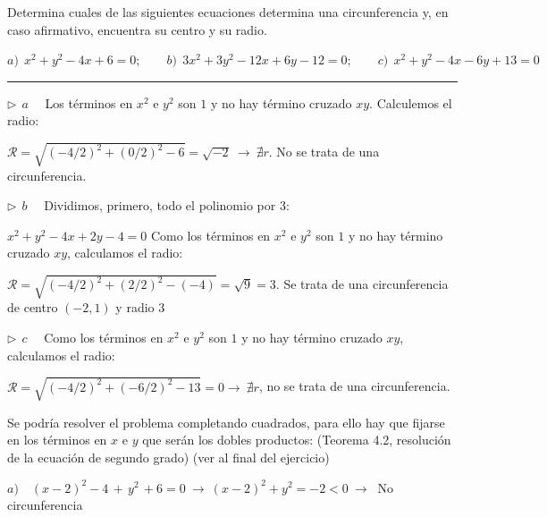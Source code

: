 \vspace{5mm}

\begin{miejercicio}

Determina cuales de las siguientes ecuaciones determina una circunferencia y, en caso afirmativo, encuentra su centro y su radio.

\vspace{2mm} $a)\ \ x^2+y^2-4x+6=0;\qquad b)\ \ 3x^2+3y^2-12x+6y-12=0;\qquad c)\ \ x^2+y^2-4x-6y+13=0$

\rule{250pt}{0.1pt}

\vspace{2mm} $\triangleright \ \ a \quad $ Los términos en $x^2$ e $y^2$ son $1$ y no hay término cruzado $xy$. Calculemos el radio:

\vspace{2mm} $\mathcal R=\sqrt{(-4/2)^2+(0/2)^2-6}=\sqrt{-2} \ \to \ \nexists r$. No se trata de una circunferencia.


\vspace{4mm} $\triangleright \ \ b \quad $ Dividimos, primero, todo el polinomio por $3$:

\vspace{2mm} $x^2+y^2-4x+2y-4=0$ Como los términos en $x^2$ e $y^2$ son $1$ y no hay término cruzado $xy$, calculamos el radio:

\vspace{2mm} $\mathcal R=\sqrt{(-4/2)^2+(2/2)^2-(-4)}=\sqrt{9}=3$. Se trata de una circunferencia de centro $(-2,1)$ y radio $3$

\vspace{4mm} $\triangleright \ \ c \quad $ Como los términos en $x^2$ e $y^2$ son $1$ y no hay término cruzado $xy$, calculamos el radio:

\vspace{2mm} $\mathcal R=\sqrt{(-4/2)^2+(-6/2)^2-13}=0 \to \ \nexists r$, no se trata de una circunferencia.

\color{gris}
\vspace{4mm} Se podría resolver el problema completando cuadrados, para ello hay que fijarse en los términos en $x$ e $y$ que serán los dobles productos:	(Teorema 4.2, resolución de la ecuación de segundo grado) (ver al final del ejercicio)

\color{gris}
\vspace{2mm} $a)\quad (x-2)^2-4 \, + \, y^2 \, + 6 = 0 \ \to \ (x-2)^2+y^2=-2 <0\ \to \ $ No circunferencia




\end{miejercicio}

